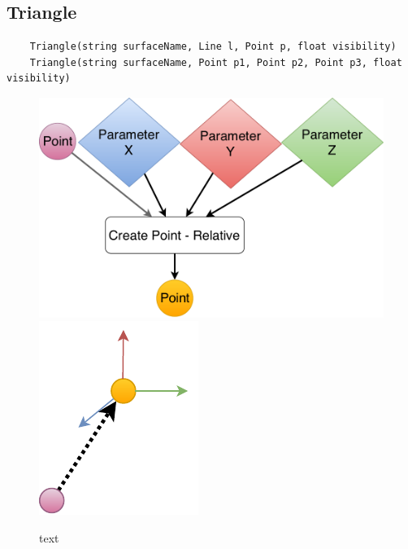 \subsection{Triangle}
\begin{lstlisting}
	Triangle(string surfaceName, Line l, Point p, float visibility)
	Triangle(string surfaceName, Point p1, Point p2, Point p3, float visibility)
\end{lstlisting}

\begin{figure}[H]
	\centering
	\includegraphics[height=0.3\textwidth]{obrazky-figures/Diagram/DP Navrh operacii-0D - Point2.pdf}
	\includegraphics[height=0.3\textwidth]{obrazky-figures/Diagram/Draw/1Points/DP Navrh operacii-0D - PointRelative.pdf}
	\caption{text}
	\label{fig:1}
\end{figure}


